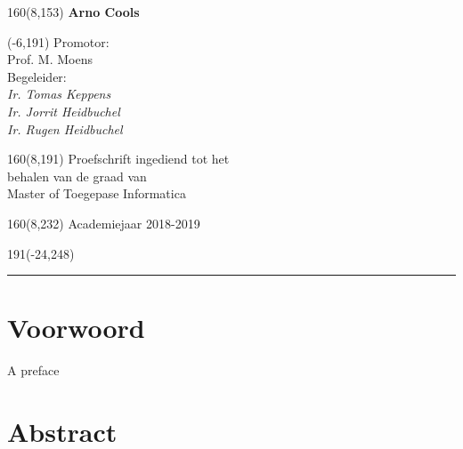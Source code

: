 \documentclass[12pt,a4paper,oneside]{book}
\begin{document}
\begin{textblock}{160}(8,153)
\textblockcolour{}
\vspace{-\parskip}
\flushright
\fontsize{14}{16}\selectfont \textbf{Arno Cools}
\end{textblock}
%
\begin{textblock}{70}(-6,191)
\textblockcolour{}
\vspace{-\parskip}
\flushleft
Promotor:\\Prof. M. Moens\\[-2pt]
\vspace{5mm}
Begeleider:\\
\textsl{Ir. Tomas Keppens\\Ir. Jorrit Heidbuchel\\Ir. Rugen Heidbuchel}\\[-2pt]
\end{textblock}
%
\begin{textblock}{160}(8,191)
\textblockcolour{}
\vspace{-\parskip}
\flushright
Proefschrift ingediend tot het\\[4.5pt]
behalen van de graad van\\[4.5pt]
Master of Toegepase Informatica\\
\end{textblock}
%
\begin{textblock}{160}(8,232)
\textblockcolour{}
\vspace{-\parskip}
\flushright
Academiejaar 2018-2019
\end{textblock}
%
\begin{textblock}{191}(-24,248)
{\color{blueline}\rule{550pt}{5.5pt}}
\end{textblock}
%
\vfill
\newpage

\rmfamily
\frontmatter
{}
\setcounter{page}{0}
\chapter{Voorwoord}

A preface

\chapter{Abstract}
\end{document}
